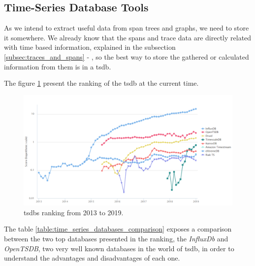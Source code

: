 \subsection{Time-Series Database Tools}
\label{subsec:time_series_database_tools}

As we intend to extract useful data from span trees and graphs, we need to store it somewhere. We already know that the spans and trace data are directly related with time based information, explained in the subsection \ref{subsec:traces_and_spans} - , so the best way to store the gathered or calculated information from them is in a \gls{tsdb}.

The figure \ref{fig:time_series_databases_ranking} present the ranking of the \gls{tsdb} at the current time\cite{tsdb_ranking}.

\begin{figure}[h!]
    \centering
    \includegraphics[width=1.00\textwidth]{images/time_series_databases_ranking.pdf}
    \caption{\gls{tsdb}s ranking from 2013 to 2019.}
    \label{fig:time_series_databases_ranking}
\end{figure}

The table \ref{table:time_series_databases_comparison} exposes a comparison between the two top databases presented in the ranking, the \textit{InfluxDb} and \textit{OpenTSDB}, two very well known databases in the world of \gls{tsdb}, in order to understand the advantages and disadvantages of each one.

